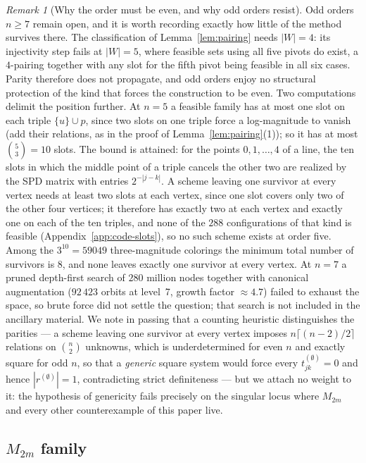 \documentclass[11pt]{article}
\theoremstyle{plain}
\theoremstyle{definition}
\theoremstyle{remark}
\newtheorem{remark}[theorem]{Remark}
\begin{document}
\begin{aiblock}
\begin{remark}[Why the order must be even, and why odd orders resist]
Odd orders $n\ge7$ remain open, and it is worth recording exactly how little of the method survives
there. The classification of Lemma~\ref{lem:pairing} needs $|W|=4$: its injectivity step fails at
$|W|=5$, where feasible sets using all five pivots do exist, a $4$-pairing together with any slot for
the fifth pivot being feasible in all six cases. Parity therefore does not propagate, and odd orders
enjoy no structural protection of the kind that forces the construction to be even. Two computations
delimit the position further. At $n=5$ a feasible family has at most one slot on each triple
$\{u\}\cup p$, since two slots on one triple force a log-magnitude to vanish (add their relations, as
in the proof of Lemma~\ref{lem:pairing}(1)); so it has at most $\binom{5}{3}=10$ slots. The bound is
attained: for the points $0,1,\dots,4$ of a line, the ten slots in which the middle point of a triple
cancels the other two are realized by the SPD matrix with entries $2^{-|j-k|}$. A scheme leaving one
survivor at every vertex needs at least two slots at each vertex, since one slot covers only two of
the other four vertices; it therefore has exactly two at each vertex and exactly one on each of the
ten triples, and none of the $288$ configurations of that kind is feasible
(Appendix~\ref{app:code-slots}), so no such scheme exists at order five. Among the $3^{10}=59049$
three-magnitude colorings the minimum total number of survivors is $8$, and none leaves exactly one
survivor at every vertex. At $n=7$ a pruned depth-first search of $280$ million nodes together with
canonical augmentation ($92\,423$ orbits at level~7, growth factor $\approx4.7$) failed to exhaust the
space, so brute force did not settle the question; that search is not included in the ancillary
material. We note in passing
that a counting heuristic distinguishes the parities --- a scheme leaving one survivor at every vertex
imposes $n\lceil(n-2)/2\rceil$ relations on $\binom{n}{2}$ unknowns, which is underdetermined for even
$n$ and exactly square for odd $n$, so that a \emph{generic} square system would force every
$t^{(\emptyset)}_{jk}=0$ and hence $|r^{(\emptyset)}|=1$, contradicting strict definiteness --- but we
attach no weight to it: the hypothesis of genericity fails precisely on the singular locus where
$M_{2m}$ and every other counterexample of this paper live.
\end{remark}

\subsection{$M_{2m}$ family}


\end{aiblock}
\end{document}
